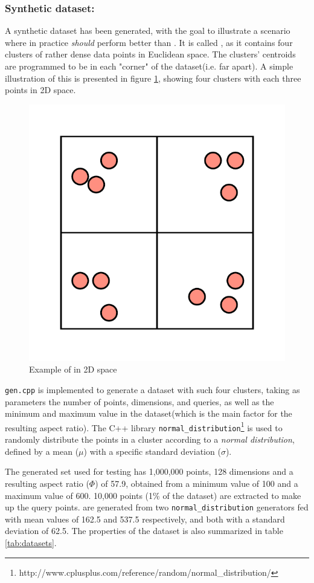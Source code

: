 \subsubsection{Synthetic dataset: \clust{}}
\label{clusters}
A synthetic dataset has been generated, with the goal to illustrate a scenario where \qsr{} in practice \textit{should} perform better than \qs{}. It is called \clust{}, as it contains four clusters of rather dense data points in Euclidean space. The clusters' centroids are programmed to be in each "corner" of the dataset(i.e. far apart). A simple illustration of this is presented in figure \ref{fig:clusters}, showing four clusters with each three points in 2D space.

\begin{figure}[h]
	\centering
	\includegraphics[scale=0.5]{figures/Clusters_example.png}
	\caption{Example of \clust{} in 2D space}
	\label{fig:clusters}
\end{figure}


\texttt{gen.cpp} is implemented to generate a dataset with such four clusters, taking as parameters the number of points, dimensions, and queries, as well as the minimum and maximum value in the dataset(which is the main factor for the resulting aspect ratio). The C++ library \texttt{normal\_distribution}\footnote{http://www.cplusplus.com/reference/random/normal\_distribution/} is used to randomly distribute the points in a cluster according to a \textit{normal distribution}, defined by a mean ($\mu$) with a specific standard deviation ($\sigma$). 

The generated set used for testing has 1,000,000 points, 128 dimensions and a resulting aspect ratio ($\Phi$) of 57.9, obtained from a minimum value of 100 and a maximum value of 600. 10,000 points (1\% of the dataset) are extracted to make up the query points. \clust{} are generated from two \texttt{normal\_distribution} generators fed with mean values of 162.5 and 537.5 respectively, and both with a standard deviation of 62.5. The properties of the dataset is also summarized in table \ref{tab:datasets}.